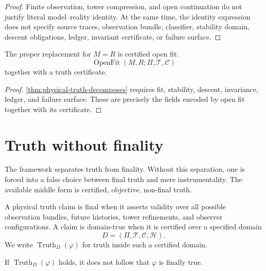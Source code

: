 \begin{proof}
Finite observation, tower compression, and open continuation do not justify literal model--reality identity. At the same time, the identity expression does not specify source traces, observation bundle, classifier, stability domain, descent obligations, ledger, invariant certificate, or failure surface.
\end{proof}

\begin{corollary}
\label{cor:certified-open-fit-replaces-identity}
The proper replacement for $M=R$ is certified open fit:
$$
\operatorname{OpenFit}(M,R;\Pi,\mathcal T,\mathcal C)
$$
together with a truth certificate.
\end{corollary}

\begin{proof}
\autoref{thm:physical-truth-decomposes} requires fit, stability, descent, invariance, ledger, and failure surface. These are precisely the fields encoded by open fit together with its certificate.
\end{proof}

\section{Truth without finality}
\label{sec:truth-without-finality}

The framework separates truth from finality. Without this separation, one is forced into a false choice between final truth and mere instrumentality. The available middle form is certified, objective, non-final truth.

\begin{definition}
\label{def:finality-domain-truth}
A physical truth claim is final when it asserts validity over all possible observation bundles, future histories, tower refinements, and observer configurations. A claim is domain-true when it is certified over a specified domain
$$
D=(\Pi,\mathcal T,\mathcal C,\mathcal H).
$$
We write $\operatorname{Truth}_D(\varphi)$ for truth inside such a certified domain.
\end{definition}

\begin{theorem}
\label{thm:domain-truth-not-final-truth}
If $\operatorname{Truth}_D(\varphi)$ holds, it does not follow that $\varphi$ is finally true.
\end{theorem}

